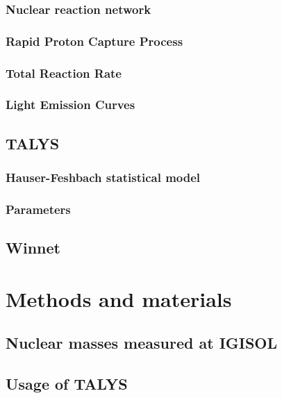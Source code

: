 \documentclass[final]{thesis} %
\begin{document}
\subsubsection{Nuclear reaction network}
\label{sec:nrn}

\subsubsection{Rapid Proton Capture Process}
\label{sec:rpprocess}

\subsubsection{Total Reaction Rate}
\label{sec:trr}

\subsubsection{Light Emission Curves}
\label{sec:lec}

\subsection{TALYS}
\label{sec:talys}

\subsubsection{Hauser-Feshbach statistical model}
\label{sec:HFsm}

\subsubsection{Parameters}
\label{sec:tparams}

\subsection{Winnet}
\label{sec:winnet}


\section{Methods and materials}
\label{sec:methods-and-materials}

\subsection{Nuclear masses measured at IGISOL}
\label{sec:igisol}

\subsection{Usage of TALYS}
\label{sec:talysmethod}
\end{document}

